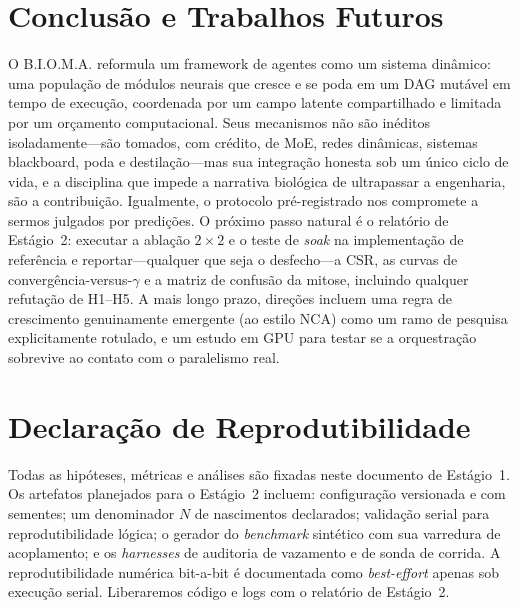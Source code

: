 \documentclass[11pt]{article}
\newcommand{\bioma}{\textsc{B.I.O.M.A.}}
\begin{document}
\section{Conclusão e Trabalhos Futuros}
O \bioma{} reformula um framework de agentes como um sistema dinâmico: uma
população de módulos neurais que cresce e se poda em um DAG mutável em tempo de
execução, coordenada por um campo latente compartilhado e limitada por um orçamento
computacional. Seus mecanismos não são inéditos isoladamente---são tomados, com
crédito, de MoE, redes dinâmicas, sistemas blackboard, poda e destilação---mas sua
integração honesta sob um único ciclo de vida, e a disciplina que impede a
narrativa biológica de ultrapassar a engenharia, são a contribuição. Igualmente, o
protocolo pré-registrado nos compromete a sermos julgados por predições. O próximo
passo natural é o relatório de Estágio~2: executar a ablação $2\times2$ e o teste de
\emph{soak} na implementação de referência e reportar---qualquer que seja o
desfecho---a CSR, as curvas de convergência-versus-$\gamma$ e a matriz de confusão
da mitose, incluindo qualquer refutação de H1--H5. A mais longo prazo, direções
incluem uma regra de crescimento genuinamente emergente (ao estilo NCA) como um
ramo de pesquisa explicitamente rotulado, e um estudo em GPU para testar se a
orquestração sobrevive ao contato com o paralelismo real.

\section*{Declaração de Reprodutibilidade}
Todas as hipóteses, métricas e análises são fixadas neste documento de Estágio~1.
Os artefatos planejados para o Estágio~2 incluem: configuração versionada e com
sementes; um denominador $N$ de nascimentos declarados; validação serial para
reprodutibilidade lógica; o gerador do \emph{benchmark} sintético com sua varredura
de acoplamento; e os \emph{harnesses} de auditoria de vazamento e de sonda de
corrida. A reprodutibilidade numérica bit-a-bit é documentada como \emph{best-effort}
apenas sob execução serial. Liberaremos código e logs com o relatório de Estágio~2.

\end{document}
